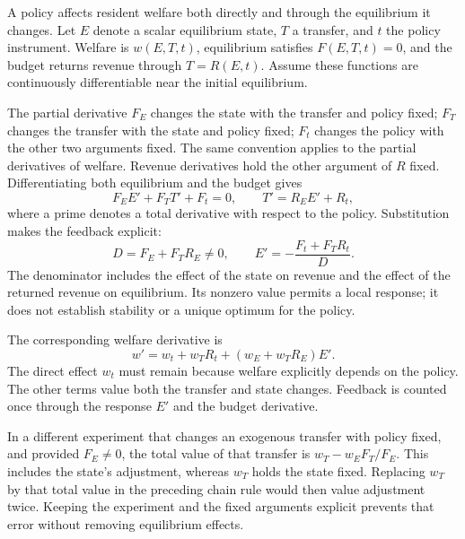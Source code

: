 A policy affects resident welfare both directly and through the equilibrium it
changes. Let $E$ denote a scalar equilibrium state, $T$ a transfer, and $t$ the
policy instrument. Welfare is $w(E,T,t)$, equilibrium satisfies $F(E,T,t)=0$,
and the budget returns revenue through $T=R(E,t)$. Assume these functions are
continuously differentiable near the initial equilibrium.

The partial derivative $F_E$ changes the state with the transfer and policy
fixed; $F_T$ changes the transfer with the state and policy fixed; $F_t$ changes
the policy with the other two arguments fixed. The same convention applies to
the partial derivatives of welfare. Revenue derivatives hold the other argument
of $R$ fixed. Differentiating both equilibrium and the budget gives
\[
 F_E E'+F_T T'+F_t=0,\qquad T'=R_E E'+R_t,
\]
where a prime denotes a total derivative with respect to the policy. Substitution
makes the feedback explicit:
\[
 D=F_E+F_T R_E\ne0,\qquad E'=-\frac{F_t+F_T R_t}{D}.
\]
The denominator includes the effect of the state on revenue and the effect of
the returned revenue on equilibrium. Its nonzero value permits a local response;
it does not establish stability or a unique optimum for the policy.

The corresponding welfare derivative is
\[
 w'=w_t+w_T R_t+(w_E+w_T R_E)E'.
\]
The direct effect $w_t$ must remain because welfare explicitly depends on the
policy. The other terms value both the transfer and state changes. Feedback is
counted once through the response $E'$ and the budget derivative.

In a different experiment that changes an exogenous transfer with policy fixed,
and provided $F_E\ne0$, the total value of that transfer is
$w_T-w_E F_T/F_E$. This includes the state's adjustment, whereas $w_T$ holds
the state fixed. Replacing $w_T$ by that total value in the preceding chain rule
would then value adjustment twice. Keeping the experiment and the fixed
arguments explicit prevents that error without removing equilibrium effects.
